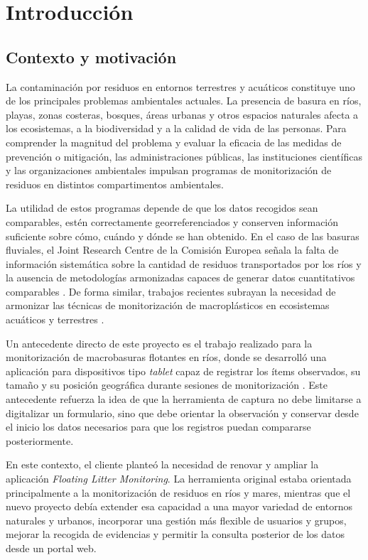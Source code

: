 \chapter{Introducción}

\section{Contexto y motivación}

La contaminación por residuos en entornos terrestres y acuáticos constituye uno de
los principales problemas ambientales actuales. La presencia de basura en ríos,
playas, zonas costeras, bosques, áreas urbanas y otros espacios naturales afecta
a los ecosistemas, a la biodiversidad y a la calidad de vida de las personas.
Para comprender la magnitud del problema y evaluar la eficacia de las medidas de
prevención o mitigación, las administraciones públicas, las instituciones
científicas y las organizaciones ambientales impulsan programas de monitorización
de residuos en distintos compartimentos ambientales.

La utilidad de estos programas depende de que los datos recogidos sean
comparables, estén correctamente georreferenciados y conserven información
suficiente sobre cómo, cuándo y dónde se han obtenido. En el caso de las basuras
fluviales, el Joint Research Centre de la Comisión Europea señala la falta de
información sistemática sobre la cantidad de residuos transportados por los ríos
y la ausencia de metodologías armonizadas capaces de generar datos cuantitativos
comparables \cite{gonzalez2016riverine}. De forma similar, trabajos recientes
subrayan la necesidad de armonizar las técnicas de monitorización de
macroplásticos en ecosistemas acuáticos y terrestres
\cite{gallitelli2024macroplastics}.

Un antecedente directo de este proyecto es el trabajo realizado para la
monitorización de macrobasuras flotantes en ríos, donde se desarrolló una
aplicación para dispositivos tipo \textit{tablet} capaz de registrar los ítems
observados, su tamaño y su posición geográfica durante sesiones de
monitorización \cite{gonzalezfernandez2017harmonized}. Este antecedente refuerza
la idea de que la herramienta de captura no debe limitarse a digitalizar un
formulario, sino que debe orientar la observación y conservar desde el inicio los
datos necesarios para que los registros puedan compararse posteriormente.

En este contexto, el cliente planteó la necesidad de renovar y ampliar la
aplicación \textit{Floating Litter Monitoring}. La herramienta original estaba
orientada principalmente a la monitorización de residuos en ríos y mares,
mientras que el nuevo proyecto debía extender esa capacidad a una mayor variedad
de entornos naturales y urbanos, incorporar una gestión más flexible de usuarios
y grupos, mejorar la recogida de evidencias y permitir la consulta posterior de
los datos desde un portal web.

